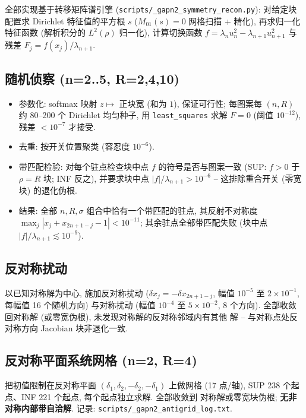\documentclass[UTF8]{ctexart}
\begin{document}
全部实现基于转移矩阵谱引擎 (\texttt{scripts/\_gapn2\_symmetry\_recon.py}):
对给定块配置求 Dirichlet 特征值的平方根 $s$ ($M_{01}(s)=0$ 网格扫描 + 精化),
再求归一化特征函数 (解析积分的 $L^2(\rho)$ 归一化), 计算切换函数
$f=\lambda_nu_n^2-\lambda_{n+1}u_{n+1}^2$ 与残差 $F_j=f(x_j)/\lambda_{n+1}$.

\subsection{随机侦察 (n=2..5, R=2,4,10)}

\begin{itemize}
	\item 参数化: softmax 映射 $z\mapsto$ 正块宽 (和为 $1$), 保证可行性;
	每图案每 $(n,R)$ 约 80--200 个 Dirichlet 均匀种子, 用
	\texttt{least\_squares} 求解 $F=0$ (阈值 $10^{-12}$), 残差 $<10^{-7}$
	才接受.
	\item 去重: 按开关位置聚类 (容忍度 $10^{-6}$).
	\item 带匹配检验: 对每个驻点检查块中点 $f$ 的符号是否与图案一致
	(SUP: $f>0$ 于 $\rho=R$ 块; INF 反之), 并要求块中点
	$|f|/\lambda_{n+1}>10^{-6}$ -- 这排除重合开关 (零宽块) 的退化伪根.
	\item 结果: 全部 $n,R,\sigma$ 组合中恰有一个带匹配的驻点, 其反射不对称度
	$\max_j|x_j+x_{2n+1-j}-1|<10^{-11}$; 其余驻点全部带匹配失败
	(块中点 $|f|/\lambda_{n+1}\lesssim10^{-9}$).
\end{itemize}

\subsection{反对称扰动}

以已知对称解为中心, 施加反对称扰动
($\delta x_j=-\delta x_{2n+1-j}$, 幅值 $10^{-5}$ 至 $2\times10^{-1}$,
每幅值 16 个随机方向) 与对称扰动 (幅值 $10^{-4}$ 至 $5\times10^{-2}$,
8 个方向). 全部收敛回对称解 (或零宽伪根), 未发现对称解的反对称邻域内有其他
解 -- 与对称点处反对称方向 Jacobian 块非退化一致.

\subsection{反对称平面系统网格 (n=2, R=4)}

把初值限制在反对称平面 $(\delta_1,\delta_2,-\delta_2,-\delta_1)$ 上做网格
(17 点/轴), SUP 238 个起点、INF 221 个起点, 每个起点独立求解. 全部收敛到
对称解或零宽块伪根; \textbf{无非对称内部带自洽解}. 记录:
\texttt{scripts/\_gapn2\_antigrid\_log.txt}.
\end{document}
